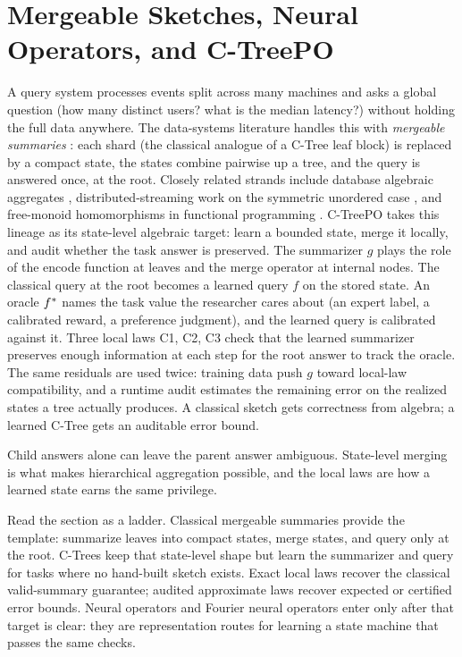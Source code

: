 \section{Mergeable Sketches, Neural Operators, and C-TreePO}
\label{sec:mergeable-sketches}

A query system processes events split across many machines and asks a
global question (how many distinct users? what is the median latency?)
without holding the full data anywhere. The data-systems literature
handles this with \emph{mergeable summaries}
\citep{Agarwal2013MergeableTODS}: each shard (the classical analogue
of a C-Tree leaf block) is replaced by a compact state, the states
combine pairwise up a tree, and the query is answered once, at the
root. Closely related strands include database algebraic
aggregates \citep{GrayEtAl1997DataCube}, distributed-streaming work on
the symmetric unordered case \citep{FeldmanEtAl2008MUD}, and free-monoid
homomorphisms in functional programming
\citep{Gibbons1996ThirdHomomorphism}. C-TreePO takes this lineage as its
state-level algebraic target: learn a bounded state, merge it locally,
and audit whether the task answer is preserved. The summarizer \(g\)
plays the role of the encode function at leaves and the merge operator
at internal nodes. The classical query at the root becomes a learned
query \(f\) on the stored state. An oracle \(f^\ast\) names the task
value the researcher cares about (an expert label, a calibrated reward,
a preference judgment), and the learned query is calibrated against it.
Three local laws C1, C2, C3 check that the learned summarizer preserves
enough information at each step for the root answer to track the
oracle. The same residuals are used twice: training data push \(g\)
toward local-law compatibility, and a runtime audit estimates the
remaining error on the realized states a tree actually produces. A
classical sketch gets correctness from algebra; a learned C-Tree gets
an auditable error bound.

Child answers alone can leave the parent answer ambiguous. State-level
merging is what makes hierarchical aggregation possible, and the local
laws are how a learned state earns the same privilege.

Read the section as a ladder. Classical mergeable summaries provide
the template: summarize leaves into compact states, merge states, and
query only at the root. C-Trees keep that state-level shape but learn
the summarizer and query for tasks where no hand-built sketch exists.
Exact local laws recover the classical valid-summary guarantee; audited
approximate laws recover expected or certified error bounds. Neural
operators and Fourier neural operators enter only after that target is
clear: they are representation routes for learning a state machine that
passes the same checks.

